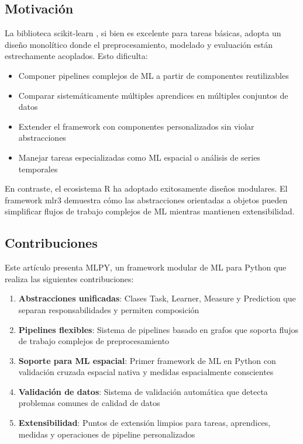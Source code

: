 \documentclass[twoside,11pt]{article}
\begin{document}
\subsection{Motivación}

La biblioteca scikit-learn \citep{pedregosa2011scikit}, si bien es excelente para tareas básicas, adopta un diseño monolítico donde el preprocesamiento, modelado y evaluación están estrechamente acoplados. Esto dificulta:
%
\begin{itemize}
  \item Componer pipelines complejos de ML a partir de componentes reutilizables
  \item Comparar sistemáticamente múltiples aprendices en múltiples conjuntos de datos
  \item Extender el framework con componentes personalizados sin violar abstracciones
  \item Manejar tareas especializadas como ML espacial o análisis de series temporales
\end{itemize}

En contraste, el ecosistema R ha adoptado exitosamente diseños modulares. El framework mlr3 \citep{lang2019mlr3} demuestra cómo las abstracciones orientadas a objetos pueden simplificar flujos de trabajo complejos de ML mientras mantienen extensibilidad.

\subsection{Contribuciones}

Este artículo presenta MLPY, un framework modular de ML para Python que realiza las siguientes contribuciones:
%
\begin{enumerate}
  \item \textbf{Abstracciones unificadas}: Clases Task, Learner, Measure y Prediction que separan responsabilidades y permiten composición
  \item \textbf{Pipelines flexibles}: Sistema de pipelines basado en grafos que soporta flujos de trabajo complejos de preprocesamiento
  \item \textbf{Soporte para ML espacial}: Primer framework de ML en Python con validación cruzada espacial nativa y medidas espacialmente conscientes
  \item \textbf{Validación de datos}: Sistema de validación automática que detecta problemas comunes de calidad de datos
  \item \textbf{Extensibilidad}: Puntos de extensión limpios para tareas, aprendices, medidas y operaciones de pipeline personalizados
\end{enumerate}
\end{document}
